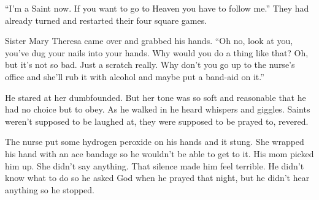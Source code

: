 \documentclass[12pt]{article}
\begin{document}
“I’m a Saint now. If you want to go to Heaven you have to follow me.” They had already turned and restarted their four square games.

Sister Mary Theresa came over and grabbed his hands. “Oh no, look at you, you’ve dug your nails into your hands. Why would you do a thing like that? Oh, but it’s not so bad. Just a scratch really. Why don’t you go up to the nurse’s office and she’ll rub it with alcohol and maybe put a band-aid on it.”

He stared at her dumbfounded. 
But her tone was so soft and reasonable that he had no choice but to obey. 
As he walked in he heard whispers and giggles. 
Saints weren’t supposed to be laughed at, they were supposed to be prayed to, revered.

The nurse put some hydrogen peroxide on his hands and it stung. 
She wrapped his hand with an ace bandage so he wouldn’t be able to get to it. 
His mom picked him up. She didn’t say anything. That silence made him feel terrible.
He didn’t know what to do so he asked God when he prayed that night, but he didn’t hear anything so he stopped.
\end{document}
